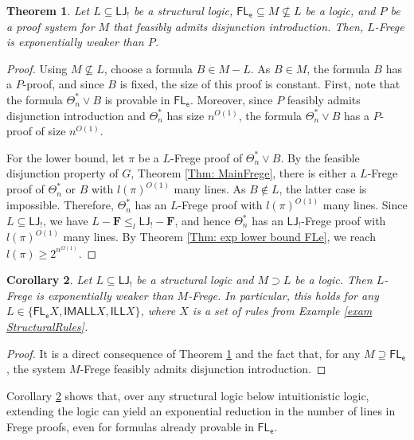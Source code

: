 \documentclass[12pt,a4paper]{article}
\theoremstyle{plain}
\newtheorem{theorem}{Theorem}
\newtheorem{corollary}[theorem]{Corollary}
\theoremstyle{definition}
\begin{document}
\begin{theorem}\label{thm: MainLowerBound}
Let $L \subseteq \mathsf{LJ_!}$ be a structural logic, $\mathsf{FL_e} \subseteq M \nsubseteq L$ be a logic, and $P$ be a proof system for $M$ that feasibly admits disjunction introduction. Then, $L$-Frege is exponentially weaker than $P$.
\end{theorem}
\begin{proof}
Using $M \nsubseteq L$, choose a formula $B \in M-L$. As $B \in M$, the formula $B$ has a $P$-proof, and since $B$ is fixed, the size of this proof is constant. First, note that the formula $\Theta^*_n \vee B$ is provable in $\mathsf{FL_e}$. Moreover, since $P$ feasibly admits disjunction introduction and $\Theta^*_n$ has size $n^{O(1)}$, the formula $\Theta^*_n \vee B$ has a $P$-proof of size $n^{O(1)}$.

For the lower bound, let $\pi$ be a $L$-Frege proof of $\Theta^{*}_n \vee B$. By the feasible disjunction property of $G$, Theorem \ref{Thm: MainFrege}, there is either a $L$-Frege proof of $\Theta^{*}_n$ or $B$ with $l(\pi)^{O(1)}$ many lines. As $B \notin L$, the latter case is impossible. Therefore, $ \Theta^{*}_n$ has an $L$-Frege proof with $l(\pi)^{O(1)}$ many lines. Since $L \subseteq \mathsf{LJ_!}$, we have $L-\mathbf{F} \leq_l \mathsf{LJ_!}-\mathbf{F}$, and hence $\Theta^{*}_n$ has an $\mathsf{LJ_!}$-Frege proof with $l(\pi)^{O(1)}$ many lines. By Theorem \ref{Thm: exp lower bound FLe}, we reach $l(\pi) \geq 2^{n^{\Omega(1)}}$.
\end{proof}

\begin{corollary}\label{cor: Main}
Let $L \subseteq \mathsf{LJ_!}$ be a structural logic and $M \supset L$ be a logic. Then $L$-Frege is exponentially weaker than $M$-Frege. In particular, this holds for any $L \in \{\mathsf{FL_e}X, \mathsf{IMALL}X, \mathsf{ILL}X\}$, where $X$ is a set of rules from Example \ref{exam StructuralRules}.
\end{corollary}
\begin{proof}
It is a direct consequence of Theorem \ref{thm: MainLowerBound} and the fact that, for any $M \supseteq \mathsf{FL_e}$, the system $M$-Frege feasibly admits disjunction introduction.
\end{proof}

Corollary \ref{cor: Main} shows that, over any structural logic below intuitionistic logic, extending the logic can yield an exponential reduction in the number of lines in Frege proofs, even for formulas already provable in $\mathsf{FL_e}$.
\end{document}
